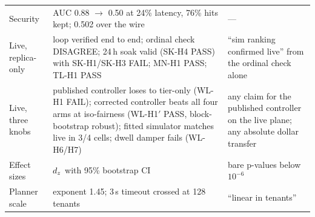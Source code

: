 \begin{longtable}{@{}>{\raggedright\arraybackslash}p{}>{\raggedright\arraybackslash}p{}>{\raggedright\arraybackslash}p{}@{}}
Security & AUC 0.88 $\to$ 0.50 at 24\% latency, 76\% hits kept; 0.502 over
the wire & --- \\
Live, replica-only & loop verified end to end; ordinal check DISAGREE; 24\,h
soak valid (SK-H4 PASS) with SK-H1/SK-H3 FAIL; MN-H1 PASS; TL-H1 PASS &
``sim ranking confirmed live'' from the ordinal check alone \\
Live, three knobs & published controller loses to tier-only (WL-H1 FAIL);
corrected controller beats all four arms at iso-fairness (WL-H1$'$ PASS,
block-bootstrap robust); fitted simulator matches live in 3/4 cells; dwell
damper fails (WL-H6/H7) & any claim for the published controller on the
live plane; any absolute dollar transfer \\
Effect sizes & $d_z$ with 95\% bootstrap CI & bare p-values below
$10^{-6}$ \\
Planner scale & exponent 1.45; 3\,s timeout crossed at 128 tenants &
``linear in tenants'' \\
\bottomrule
\end{longtable}
\endgroup
